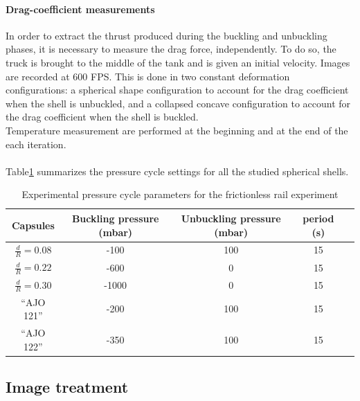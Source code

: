 \paragraph{Drag-coefficient measurements}
In order to extract the thrust produced during the buckling and unbuckling phases, it is necessary to measure the drag force, independently. To do so, the truck is brought to the middle of the tank and is given an initial velocity. Images are recorded at 600 FPS. This is done in two constant deformation configurations: a spherical shape configuration to account for the drag coefficient when the shell is unbuckled, and a collapsed concave configuration to account for the drag coefficient when the shell is buckled.\\
Temperature measurement are performed at the beginning and at the end of the each iteration.
\paragraph{}
Table\ref{tab:pressure_cycle_configuration} summarizes the pressure cycle settings for all the studied spherical shells.
\begin{table}[H]
	\centering
		\begin{adjustbox}{width=\textwidth}
			\begin{tabular}{|c|c|c|c|c|}
				\hline
				Capsules & Buckling pressure (mbar) & Unbuckling pressure (mbar)&period (s)\\
				\hline
				$\frac{d}{R} = 0.08 $ & -100& 100 & 15\\
				$\frac{d}{R} = 0.22 $ & -600& 0 & 15\\
				$\frac{d}{R} = 0.30 $ & -1000 &  0 & 15\\
				\hline
				"`AJO 121"'& -200 & 100 & 15\\
				"`AJO 122"'& -350 & 100 & 15\\
				\hline
			\end{tabular}
		\end{adjustbox}
	\caption{Experimental pressure cycle parameters for the frictionless rail experiment}
	\label{tab:pressure_cycle_configuration}
\end{table}
\subsection{Image treatment}
